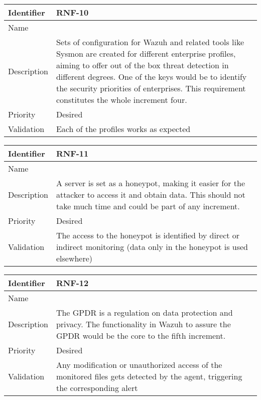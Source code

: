 \begin{table}[H]
	\begin{tabularx}{\textwidth}{|l|X|}
		\hline
		\rowcolor{gray!30}
		Identifier & \textbf{RNF-10} \\ \hline
		Name & \RNFdiez \\ \hline
		Description & Sets of configuration for Wazuh and related tools like Sysmon are created for different enterprise profiles, aiming to offer out of the box threat detection in different degrees. One of the keys would be to identify the security priorities of enterprises. This requirement constitutes the whole increment four. \\ \hline
		Priority & Desired \\ \hline
		Validation & Each of the profiles works as expected \\ \hline
	\end{tabularx}
\end{table}
\begin{table}[H]
	\begin{tabularx}{\textwidth}{|l|X|}
		\hline
		\rowcolor{gray!30}
		Identifier & \textbf{RNF-11} \\ \hline
		Name & \RNFonce \\ \hline
		Description & A server is set as a honeypot, making it easier for the attacker to access it and obtain data. This should not take much time and could be part of any increment. \\ \hline
		Priority & Desired \\ \hline
		Validation & The access to the honeypot is identified by direct or indirect monitoring (data only in the honeypot is used elsewhere) \\ \hline
	\end{tabularx}
\end{table}
\begin{table}[H]
	\begin{tabularx}{\textwidth}{|l|X|}
		\hline
		\rowcolor{gray!30}
		Identifier & \textbf{RNF-12} \\ \hline
		Name & \RNFdoce \\ \hline
		Description & The GPDR is a regulation on data protection and privacy. The functionality in Wazuh to assure the GPDR would be the core to the fifth increment.
		\\ \hline
		Priority & Desired \\ \hline
		Validation & Any modification or unauthorized access of the monitored files gets detected by the agent, triggering the corresponding alert \\ \hline
	\end{tabularx}
\end{table}
